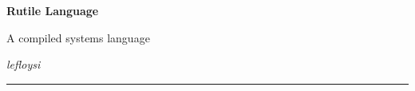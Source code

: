 \documentclass{article}
\begin{document}
\noindent
{\Huge\bfseries Rutile Language}

\vspace{0.4em}

{\large A compiled systems language}

\vspace{1.5em}

\noindent
\textit{lefloysi}

\vspace{2em}

\hrule

\vspace{1em}

\end{document}
